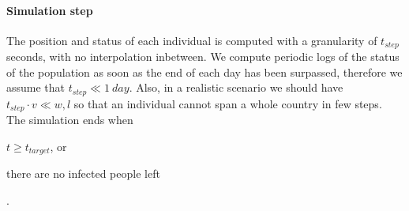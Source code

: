 \paragraph{Simulation step}
The position and status of each individual is computed with a granularity of $t_{step}$ seconds, with no interpolation inbetween.
We compute periodic logs of the status of the population as soon as the end of each day has been surpassed, therefore we assume that $t_{step} \ll \SI{1}{day}$. Also, in a realistic scenario we should have $t_{step} \cdot v \ll w,l$ so that an individual cannot span a whole country in few steps.
The simulation ends when
\begin{enumerate*}[label=(\roman*)]
    \item $t \geq t_{target}$, or
    \item there are no infected people left
\end{enumerate*}.